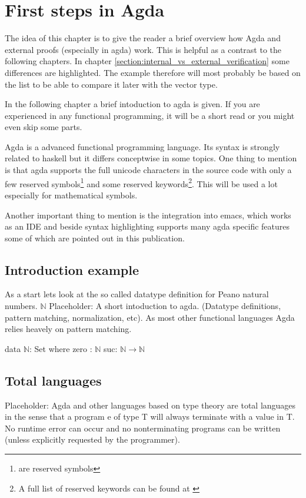 \section{First steps in Agda}\label{section:first_steps_in_agda}
The idea of this chapter is to give the reader a brief overview how Agda and external proofs (especially in agda) work. This is helpful as a contrast to the following chapters. 
In chapter \ref{section:internal_vs_external_verification} some differences are highlighted. The example therefore will most probably be based on the list to be able to compare it later with the vector type.

In the following chapter a brief intoduction to agda is given. If you are experienced in any functional programming, it will be a short read or you might even skip some parts.

Agda is a advanced functional programming language. Its syntax is strongly related to haskell but it differs conceptwise in some topics. 
One thing to mention is that agda supports the full unicode characters in the source code with only a few reserved symbols\footnote{ are reserved symbols\cite{AgdaReadTheDocsStructure}} 
and some reserved keywords\footnote{A full list of reserved keywords can be found at \cite{AgdaReadTheDocsStructure}}. This will be used a lot especially for mathematical symbols.

Another important thing to mention is the integration into emacs, which works as an IDE and beside syntax highlighting supports many agda specific features some of which are pointed out in this publication.

\subsection{Introduction example}
As a start lets look at the so called datatype definition for Peano natural numbers. $\mathbb{N}$
Placeholder: A short intoduction to agda. (Datatype definitions, pattern matching, normalization, etc).
As most other functional languages Agda relies heavely on pattern matching. 
\begin{codesnippet}[mathescape=true, caption={Peano natural numbers}, label={codeSnippet:natural_number}]
data $\mathbb{N}$: Set where
  zero : $\mathbb{N}$
  suc: $\mathbb{N} \rightarrow \mathbb{N}$
\end{codesnippet}

\subsection{Total languages}
Placeholder: Agda and other languages based on type theory are total languages in the sense that a program e of type T will always terminate with a value in T. 
No runtime error can occur and no nonterminating programs can be written (unless explicitly requested by the programmer)\cite{AgdaReadTheDocs}.

